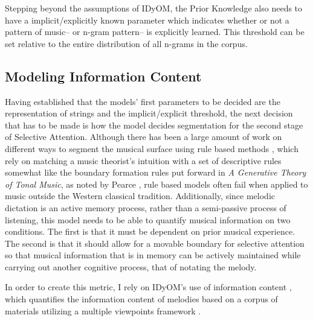 \documentclass[12pt,]{book}
\begin{document}
Stepping beyond the assumptions of IDyOM, the Prior Knowledge also needs to have a implicit/explicitly known parameter which indicates whether or not a pattern of music-- or n-gram pattern-- is explicitly learned.
This threshold can be set relative to the entire distribution of all n-grams in the corpus.

\hypertarget{modeling-information-content}{%
\subsection{Modeling Information Content}\label{modeling-information-content}}

Having established that the models' first parameters to be decided are the representation of strings and the implicit/explicit threshold, the next decision that has to be made is how the model decides segmentation for the second stage of Selective Attention.
Although there has been a large amount of work on different ways to segment the musical surface using rule based methods \citep{lerdahlGenerativeTheoryTonal1986, margulisModelMelodicExpectation2005, narmourAnalysisCognitionBasic1990, narmourAnalysisCognitionMelodic1992}, which rely on matching a music theorist's intuition with a set of descriptive rules somewhat like the boundary formation rules put forward in \emph{A Generative Theory of Tonal Music}, as noted by Pearce \citep{pearceStatisticalLearningProbabilistic2018a}, rule based models often fail when applied to music outside the Western classical tradition.
Additionally, since melodic dictation is an active memory process, rather than a semi-passive process of listening, this model needs to be able to quantify musical information on two conditions.
The first is that it must be dependent on prior musical experience.
The second is that it should allow for a movable boundary for selective attention so that musical information that is in memory can be actively maintained while carrying out another cognitive process, that of notating the melody.

In order to create this metric, I rely on IDyOM's use of information content \citep{shannonMathematicalTheoryCommunication1948}, which quantifies the information content of melodies based on a corpus of materials utilizing a multiple viewpoints framework \citep{conklinMultipleViewpointSystems1995}.
\end{document}
